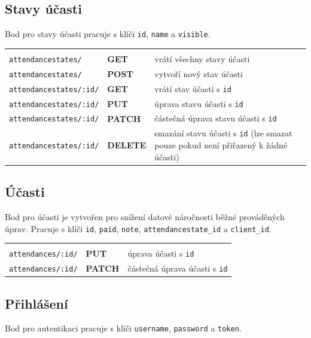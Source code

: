         \subsection{Stavy účasti}
        Bod pro stavy účasti pracuje s klíči \verb|id|, \verb|name| a \verb|visible|.
        
            {\centering
            \begin{tabular}{p{\apiA\textwidth} p{\apiB\textwidth} p{\apiC\textwidth}}&&\\
                \verb|attendancestates/|    & \textbf{GET}      & vrátí všechny stavy účasti\\
                \verb|attendancestates/|    & \textbf{POST}     & vytvoří nový stav účasti\\
                \verb|attendancestates/:id/|& \textbf{GET}      & vrátí stav účasti s \verb|id|\\
                \verb|attendancestates/:id/|& \textbf{PUT}      & úprava stavu účasti s \verb|id|\\
                \verb|attendancestates/:id/|& \textbf{PATCH}    & částečná úprava stavu účasti s \verb|id|\\
                \verb|attendancestates/:id/|& \textbf{DELETE}   & smazání stavu účasti s \verb|id| (lze smazat pouze pokud není přiřazený k žádné účasti)\\
            \end{tabular}}
            
        \subsection{Účasti}
        Bod pro účasti je vytvořen pro snížení datové náročnosti běžné prováděných úprav. Pracuje s klíči \verb|id|, \verb|paid|, \verb|note|, \verb|attendancestate_id| a \verb|client_id|.
        
            {\centering
            \begin{tabular}{p{\apiA\textwidth} p{\apiB\textwidth} p{\apiC\textwidth}}&&\\
                \verb|attendances/:id/|     & \textbf{PUT}      & úprava účasti s \verb|id|\\
                \verb|attendances/:id/|     & \textbf{PATCH}    & částečná úprava účasti s \verb|id|\\
            \end{tabular}}
            
        \subsection{Přihlášení}
        Bod pro autentikaci pracuje s klíči \verb|username|, \verb|password| a \verb|token|.
        
